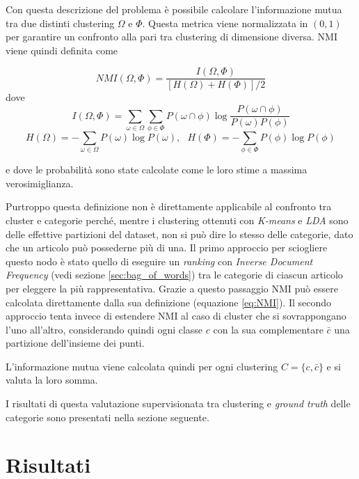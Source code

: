 \documentclass[
	11pt, %
	a4paper, %
	oneside, %
	headinclude,footinclude, %
	BCOR5mm, %
]{scrartcl}
\begin{document}
			Con questa descrizione del problema è possibile calcolare l'informazione mutua tra due distinti clustering $\Omega$ e $\Phi$.
			Questa metrica viene normalizzata in $(0, 1)$ per garantire un confronto alla pari tra clustering di dimensione diversa.
			NMI viene quindi definita come

			\begin{equation} \label{eq:NMI}
				NMI(\Omega, \Phi) = \frac
					{I(\Omega, \Phi)}
					{\left[ H(\Omega) + H(\Phi)\right] / 2}
			\end{equation}
			dove
			$$ I(\Omega, \Phi) =
					\sum_{\omega \in \Omega} \sum_{\phi \in \Phi}
						P(\omega \cap \phi) \log \frac {P(\omega \cap \phi)} {P(\omega) P(\phi)} $$
			$$ H(\Omega) = - \sum_{\omega \in \Omega} P(\omega) \log P(\omega), ~~~ H(\Phi) = - \sum_{\phi \in \Phi} P(\phi) \log P(\phi) $$

			e dove le probabilità sono state calcolate come le loro stime a massima verosimiglianza.

			\smallbreak

			Purtroppo questa definizione non è direttamente applicabile al confronto tra cluster e categorie perché, mentre i clustering ottenuti con \emph{K-means} e \emph{LDA} sono delle effettive partizioni del dataset, non si può dire lo stesso delle categorie, dato che un articolo può possederne più di una.
			\smallbreak
			Il primo approccio per sciogliere questo nodo è stato quello di eseguire un \emph{ranking} con \emph{Inverse Document Frequency} (vedi sezione \ref{sec:bag_of_words}) tra le categorie di ciascun articolo per eleggere la più rappresentativa.
			Grazie a questo passaggio NMI può essere calcolata direttamente dalla sua definizione (equazione \ref{eq:NMI}).
			\smallbreak
			Il secondo approccio tenta invece di estendere NMI al caso di cluster che si sovrappongano l'uno all'altro, considerando quindi ogni classe $c$ con la sua complementare $\bar{c}$ una partizione dell'insieme dei punti.

			L'informazione mutua viene calcolata quindi per ogni clustering $C = \{c, \bar{c}\}$ e si valuta la loro somma.

			\smallbreak
			I risultati di questa valutazione supervisionata tra clustering e \emph{ground truth} delle categorie sono presentati nella sezione seguente.

\section{Risultati} \label{sec:results}
\end{document}
